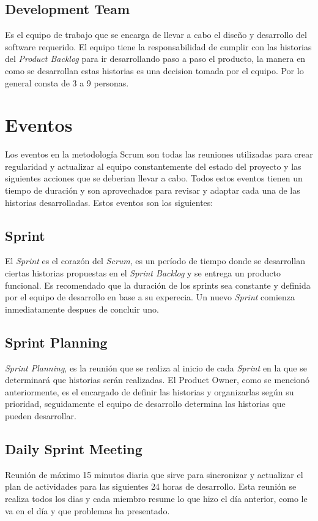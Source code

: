 \subsection{Development Team} \label{sect:Development Team}
Es el equipo de trabajo que se encarga de llevar a cabo el diseño y desarrollo del software requerido. El equipo tiene la responsabilidad de cumplir con las historias del \textit{Product Backlog} para ir desarrollando paso a paso el producto, la manera en como se desarrollan estas historias es una decision tomada por el equipo. Por lo general consta de 3 a 9 personas.\cite{SCRUM}


\section{Eventos} \label{sect:Eventos}
Los eventos en la metodología Scrum son todas las reuniones utilizadas para crear regularidad y actualizar al equipo constantemente del estado del proyecto y las siguientes acciones que se deberian llevar a cabo. Todos estos eventos tienen un tiempo de duración y son aprovechados para revisar y adaptar cada una de las historias desarrolladas. Estos eventos son los siguientes:\cite{SCRUM}

\subsection{Sprint} \label{sect:Sprint}
El \textit{Sprint} es el corazón del \textit{Scrum}, es un período de tiempo donde se desarrollan ciertas historias propuestas en el \textit{Sprint Backlog} y se entrega un producto funcional. Es recomendado que la duración de los sprints sea constante y definida por el equipo de desarrollo en base a su experecia. Un nuevo \textit{Sprint} comienza inmediatamente despues de concluir uno.

\subsection{Sprint Planning} \label{sect:Sprint Planning}
\textit{Sprint Planning}, es la reunión que se realiza al inicio de cada \textit{Sprint} en la que se determinará que historias serán realizadas. El Product Owner, como se mencionó anteriormente, es el encargado de definir las historias y organizarlas según su prioridad, seguidamente el equipo de desarrollo determina las historias que pueden desarrollar.\cite{SCRUM}

\subsection{Daily Sprint Meeting} \label{sect:Daily Sprint Meeting}
Reunión de máximo 15 minutos diaria que sirve para sincronizar y actualizar el plan de actividades para las siguientes 24 horas de desarrollo. Esta reunión se realiza todos los dias y cada miembro resume lo que hizo el día anterior, como le va en el día y que problemas ha presentado.\cite{SCRUM}

